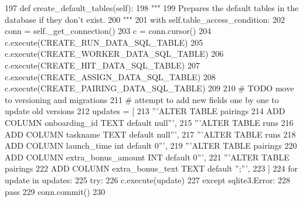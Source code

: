 \begin{DoxyCode}
197     \textcolor{keyword}{def }create\_default\_tables(self):
198         \textcolor{stringliteral}{"""}
199 \textcolor{stringliteral}{        Prepares the default tables in the database if they don't exist.}
200 \textcolor{stringliteral}{        """}
201         with self.table\_access\_condition:
202             conn = self.\_get\_connection()
203             c = conn.cursor()
204             c.execute(CREATE\_RUN\_DATA\_SQL\_TABLE)
205             c.execute(CREATE\_WORKER\_DATA\_SQL\_TABLE)
206             c.execute(CREATE\_HIT\_DATA\_SQL\_TABLE)
207             c.execute(CREATE\_ASSIGN\_DATA\_SQL\_TABLE)
208             c.execute(CREATE\_PAIRING\_DATA\_SQL\_TABLE)
209 
210             \textcolor{comment}{# TODO move to versioning and migrations}
211             \textcolor{comment}{# attempt to add new fields one by one to update old versions}
212             updates = [
213                 \textcolor{stringliteral}{'''ALTER TABLE pairings}
214 \textcolor{stringliteral}{                   ADD COLUMN onboarding\_id TEXT default null'''},
215                 \textcolor{stringliteral}{'''ALTER TABLE runs}
216 \textcolor{stringliteral}{                   ADD COLUMN taskname TEXT default null'''},
217                 \textcolor{stringliteral}{'''ALTER TABLE runs}
218 \textcolor{stringliteral}{                   ADD COLUMN launch\_time int default 0'''},
219                 \textcolor{stringliteral}{'''ALTER TABLE pairings}
220 \textcolor{stringliteral}{                   ADD COLUMN extra\_bonus\_amount INT default 0'''},
221                 \textcolor{stringliteral}{'''ALTER TABLE pairings}
222 \textcolor{stringliteral}{                   ADD COLUMN extra\_bonus\_text TEXT default '';'''},
223             ]
224             \textcolor{keywordflow}{for} update \textcolor{keywordflow}{in} updates:
225                 \textcolor{keywordflow}{try}:
226                     c.execute(update)
227                 \textcolor{keywordflow}{except} sqlite3.Error:
228                     \textcolor{keywordflow}{pass}
229             conn.commit()
230 
\end{DoxyCode}
\mbox{\label{classparlai_1_1mturk_1_1core_1_1mturk__data__handler_1_1MTurkDataHandler_a13d0c1ca0cf41f7f7aca992c995da261}} 
